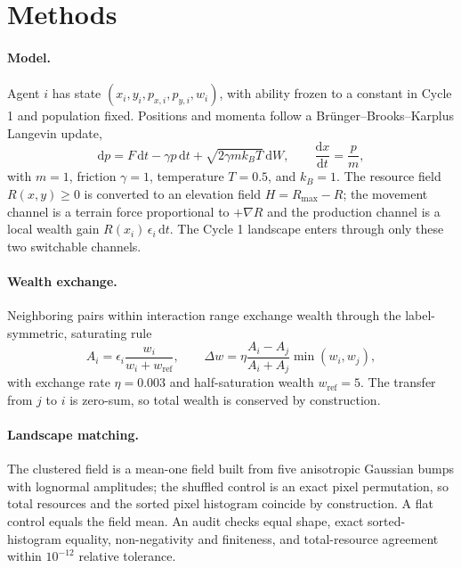 \documentclass[11pt]{article}
\begin{document}
\section*{Methods}
\label{sec:methods}

\paragraph{Model.} Agent $i$ has state
$(x_i,y_i,p_{x,i},p_{y,i},w_i)$, with ability frozen to a constant in
Cycle 1 and population fixed. Positions and momenta follow a
Br\"unger--Brooks--Karplus Langevin update,
\begin{equation}
\mathrm{d}p = F\,\mathrm{d}t-\gamma p\,\mathrm{d}t+\sqrt{2\gamma m k_B T}\,\mathrm{d}W,
\qquad
\frac{\mathrm{d}x}{\mathrm{d}t}=\frac{p}{m},
\end{equation}
with $m=1$, friction $\gamma=1$, temperature $T=0.5$, and $k_B=1$. The
resource field $R(x,y)\ge0$ is converted to an elevation field
$H=R_{\max}-R$; the movement channel is a terrain force proportional to
$+\nabla R$ and the production channel is a local wealth gain
$R(x_i)\,\epsilon_i\,\mathrm{d}t$. The Cycle 1 landscape enters through only
these two switchable channels.

\paragraph{Wealth exchange.} Neighboring pairs within interaction range exchange
wealth through the label-symmetric, saturating rule
\begin{equation}
A_i=\epsilon_i\frac{w_i}{w_i+w_{\mathrm{ref}}},\qquad
\Delta w=\eta\frac{A_i-A_j}{A_i+A_j}\min(w_i,w_j),
\end{equation}
with exchange rate $\eta=0.003$ and half-saturation wealth $w_{\mathrm{ref}}=5$.
The transfer from $j$ to $i$ is zero-sum, so total wealth is conserved by
construction.

\paragraph{Landscape matching.} The clustered field is a mean-one field built
from five anisotropic Gaussian bumps with lognormal amplitudes; the shuffled
control is an exact pixel permutation, so total resources and the sorted
pixel histogram coincide by construction. A flat control equals the field mean.
An audit checks equal shape, exact sorted-histogram equality, non-negativity and
finiteness, and total-resource agreement within $10^{-12}$ relative tolerance.
\end{document}
